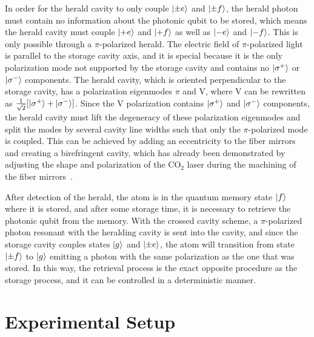 \documentclass[a4paper]{article}
\begin{document}
In order for the herald cavity to only couple $\ket{\pm e}$ and $\ket{\pm f}$, the herald photon must contain no information about the photonic qubit to be stored, which means the herald cavity must couple $\ket{+e}$ and $\ket{+f}$ as well as $\ket{-e}$ and $\ket{-f}$. This is only possible through a $\pi$-polarized herald. The electric field of $\pi$-polarized light is parallel to the storage cavity axis, and it is special because it is the only polarization mode not supported by the storage cavity and contains no $\ket{\sigma^+}$ or $\ket{\sigma^-}$ components. The herald cavity, which is oriented perpendicular to the storage cavity, has a polarization eigenmodes $\pi$  and V, where V can be rewritten as $\frac{1}{\sqrt{2}}[\ket{\sigma^+}+\ket{\sigma^-}]$. Since the V polarization contains $\ket{\sigma^+}$ and $\ket{\sigma^-}$ components, the herald cavity must lift the degeneracy of these polarization eigenmodes and split the modes by several cavity line widths such that only the $\pi$-polarized mode is coupled. This can be achieved by adding an eccentricity to the fiber mirrors and creating a birefringent cavity, which has already been demonstrated by adjusting the shape and polarization of the CO$_2$ laser during the machining of the fiber mirrors~\cite{Uphoff2015a}. 

After detection of the herald, the atom is in the quantum memory state $\ket{f}$ where it is stored, and after some storage time, it is necessary to retrieve the photonic qubit from the memory. With the crossed cavity scheme, a $\pi$-polarized photon resonant with the heralding cavity is sent into the cavity, and since the storage cavity couples states $\ket{g}$ and $\ket{\pm e}$, the atom will transition from state $\ket{\pm f}$ to $\ket{g}$ emitting a photon with the same polarization as the one that was stored. In this way, the retrieval process is the exact opposite procedure as the storage process, and it can be controlled in a deterministic manner.  

\section{Experimental Setup}
\end{document}
